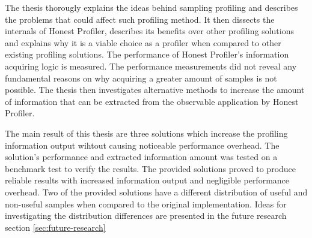 \documentclass[..thesis.tex]{subfiles}
\begin{document}
The thesis thorougly explains the ideas behind sampling profiling and describes the problems that could affect such profiling method. It then dissects the internals of Honest Profiler, describes its benefits over other profiling solutions and explains why it is a viable choice as a profiler when compared to other existing profiling solutions. The performance of Honest Profiler's information acquiring logic is measured. The performance measurements did not reveal any fundamental reasons on why acquiring a greater amount of samples is not possible. The thesis then investigates alternative methods to increase the amount of information that can be extracted from the observable application by Honest Profiler.

The main result of this thesis are three solutions which increase the profiling information output wihtout causing noticeable performance overhead. The solution's performance and extracted information amount was tested on a benchmark test to verify the results. The provided solutions proved to produce reliable results with increased information output and negligible performance overhead. Two of the provided solutions have a different distribution of useful and non-useful samples when compared to the original implementation. Ideas for investigating the distribution differences are presented in the future research section \ref{sec:future-research}

\end{document}
